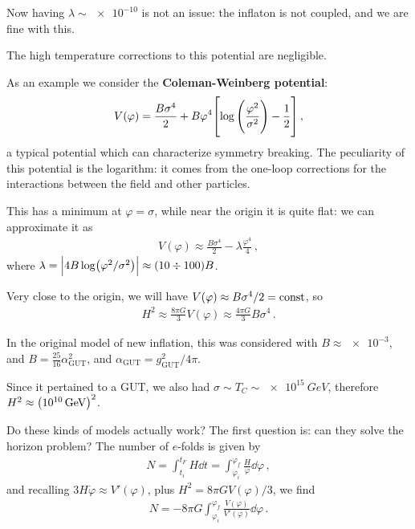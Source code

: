 \documentclass[main.tex]{subfiles}
\begin{document}
Now having \(\lambda \sim \num{e-10}\) is not an issue: the inflaton is not coupled, and we are fine with this. 

The high temperature corrections to this potential are negligible.

As an example we consider the \textbf{Coleman-Weinberg potential}: 
%
\begin{align}
V(\varphi ) = \frac{B \sigma^{4}}{2}
+ B \varphi^{4} \qty[\log \qty(\frac{\varphi^2}{\sigma^2}) - \frac{1}{2}]
\,,
\end{align}
%
a typical potential which can characterize symmetry breaking. 
The peculiarity of this potential is the logarithm: it comes from the one-loop corrections for the interactions between the field and other particles. 

This has a minimum at \(\varphi = \sigma \), while near the origin it is quite flat: we can approximate it as 
%
\begin{align}
V(\varphi ) \approx \frac{B \sigma^{4}}{2} - \lambda \frac{\varphi^{4}}{4} 
\,,
\end{align}
%
where \(\lambda = \abs{4 B \log (\varphi^2 / \sigma^2)} \approx \qty(\num{10} \divisionsymbol \num{100}) B\). 

Very close to the origin, we will have \(V(\varphi ) \approx B \sigma^{4} / 2 = \text{const}\), so 
%
\begin{align}
H^2 \approx \frac{8 \pi G}{3} V(\varphi ) \approx \frac{4 \pi G}{3} B \sigma^{4}
\,.
\end{align}

In the original model of new inflation, this was considered with \(B \approx \num{e-3}\), and \(B = \frac{25}{16} \alpha^2 _{\text{GUT}}\), and \(\alpha _{\text{GUT}} = g _{\text{GUT}}^2 / 4 \pi \). 

Since it pertained to a GUT, we also had \(\sigma \sim T_C \sim \SI{e15}{GeV}\), therefore \(H^2 \approx \qty(\SI{e10}{GeV})^2\). 

Do these kinds of models actually work? The first question is: can they solve the horizon problem? The number of \(e\)-folds is given by 
%
\begin{align}
N = \int _{t_i}^{t_F} H \dd{t} = \int_{\varphi _i}^{\varphi _f} \frac{H}{\dot{\varphi}} \dd{\varphi }
\,,
\end{align}
%
and recalling \(3 H \dot{\varphi} \approx V' (\varphi )\), plus \(H^2= 8 \pi G V(\varphi ) /3\), we find 
%
\begin{align}
N = - 8 \pi G \int_{\varphi _i}^{\varphi _f} \frac{V(\varphi )}{V'(\varphi )} \dd{\varphi }
\,.
\end{align}
\end{document}
